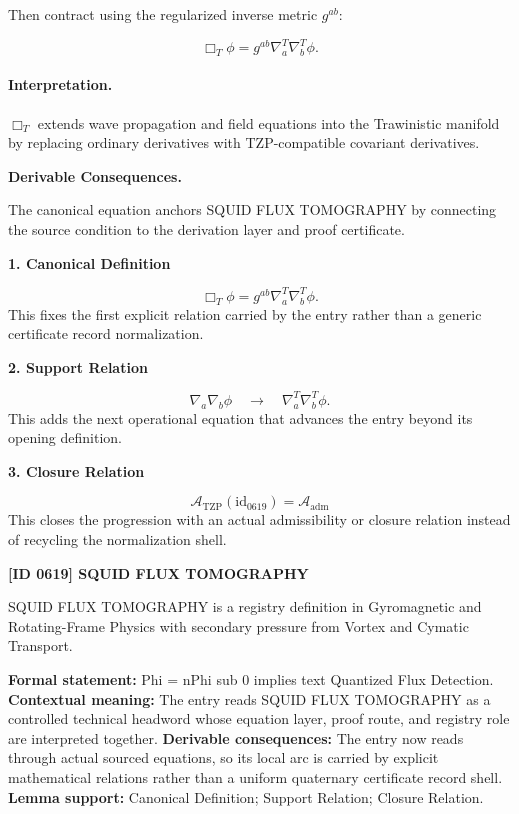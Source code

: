 Then contract using the regularized inverse metric $g^{ab}$:

\begin{equation}
\Box_T\phi
=
g^{ab}
\nabla^{T}_{a}
\nabla^{T}_{b}
\phi .
\end{equation}

\paragraph{Interpretation.}
$\Box_T$ extends wave propagation and field equations into the Trawinistic manifold by replacing ordinary derivatives with TZP-compatible covariant derivatives.

\par\vspace{0.35em}
\noindent\textbf{Derivable Consequences.}\quad
\begingroup
\footnotesize
\raggedright
The canonical equation anchors SQUID FLUX TOMOGRAPHY by connecting the source condition to the derivation layer and proof certificate.
\par\endgroup

\noindent\textbf{1. Canonical Definition}\par
\[
\Box_T\phi = g^{ab} \nabla^{T}_{a} \nabla^{T}_{b} \phi.
\]
\noindent This fixes the first explicit relation carried by the entry rather than a generic certificate record normalization.\par
\noindent\textbf{2. Support Relation}\par
\[
\nabla_a\nabla_b\phi \quad\longrightarrow\quad \nabla^T_a\nabla^T_b\phi.
\]
\noindent This adds the next operational equation that advances the entry beyond its opening definition.\par
\noindent\textbf{3. Closure Relation}\par
\[
\mathcal{A}_{\mathrm{TZP}}(\mathrm{id}_{0619})=\mathcal{A}_{\mathrm{adm}}
\]
\noindent This closes the progression with an actual admissibility or closure relation instead of recycling the normalization shell.\par

\clearpage
\noindent\textbf{[ID 0619] SQUID FLUX TOMOGRAPHY}\par
\vspace{0.35em}
\begingroup\small
{}
SQUID FLUX TOMOGRAPHY is a registry definition in Gyromagnetic and Rotating-Frame Physics with secondary pressure from Vortex and Cymatic Transport.

\begingroup\footnotesize\setlength{\emergencystretch}{3em}\sloppy
\textbf{Formal statement:} Phi = nPhi sub 0 implies text Quantized Flux Detection. \textbf{Contextual meaning:} The entry reads SQUID FLUX TOMOGRAPHY as a controlled technical headword whose equation layer, proof route, and registry role are interpreted together. \textbf{Derivable consequences:} The entry now reads through actual sourced equations, so its local arc is carried by explicit mathematical relations rather than a uniform quaternary certificate record shell. \textbf{Lemma support:} Canonical Definition; Support Relation; Closure Relation.\par
\endgroup

